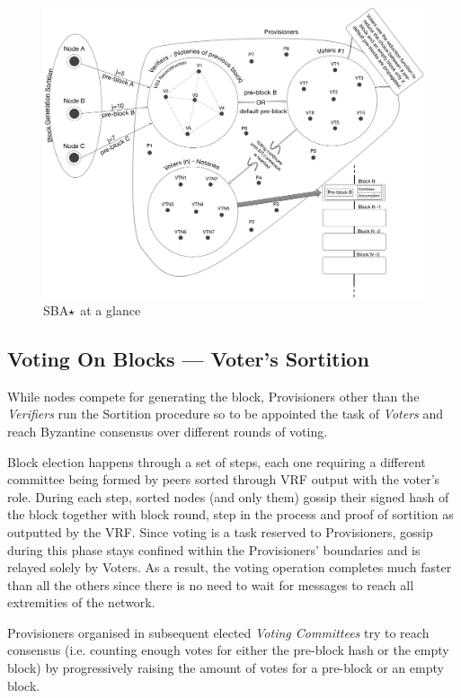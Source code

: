 \begin{figure}
\includegraphics[scale=0.2]{sba}
\caption{SBA$\large\star$ at a glance}
\end{figure}

\subsection{Voting On Blocks --- Voter's Sortition}

While nodes compete for generating the block, Provisioners other than
the \emph{Verifiers} run the Sortition procedure so to be appointed the
task of \emph{Voters} and reach Byzantine consensus over different
rounds of voting.

Block election happens through a set of steps, each
one requiring a different committee being formed by peers sorted through
VRF output with the voter's role. During each step, sorted nodes (and
only them) gossip their signed hash of the block together with block
round, step in the process and proof of sortition as outputted by the
VRF. Since voting is a task reserved to Provisioners, gossip during this
phase stays confined within the Provisioners' boundaries and is relayed
solely by Voters. As a result, the voting operation completes much
faster than all the others since there is no need to wait 
for messages to reach all extremities of the network.

Provisioners organised in subsequent elected \emph{Voting Committees} try to reach consensus (i.e. counting enough votes for either the pre-block hash or the empty block) by progressively raising the amount of votes for a pre-block or an empty block.

